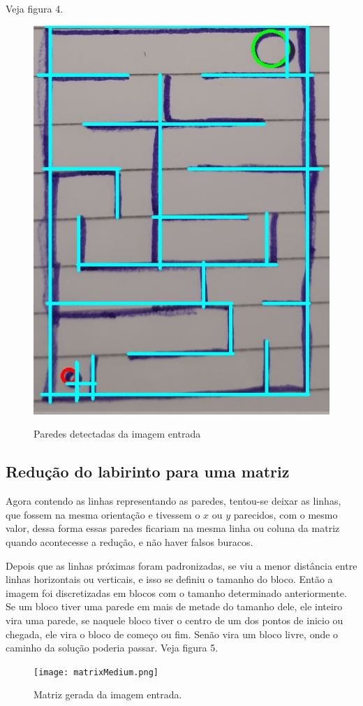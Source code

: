 \documentclass[conference]{IEEEtran}
\begin{document}
Veja figura 4.
 \begin{figure}[h!]
   \centering
    \includegraphics[scale=0.25]{lineImagemedium.jpg}
    \label{fig:medium}
    \caption{Paredes detectadas da imagem entrada}
\end{figure}
\subsection{Redução do labirinto para uma matriz}
Agora contendo as linhas representando as paredes, tentou-se deixar as linhas, que fossem na mesma orientação e tivessem o \(x\) ou \(y\) parecidos, com o mesmo valor, dessa forma essas paredes ficariam na mesma linha ou coluna da matriz quando acontecesse a redução, e não haver falsos buracos.

Depois que as linhas próximas foram padronizadas, se viu a menor distância entre linhas horizontais ou verticais, e isso se definiu o tamanho do bloco. Então a imagem foi discretizadas em blocos com o tamanho determinado anteriormente. Se um bloco tiver uma parede em mais de metade do tamanho dele, ele inteiro vira uma parede, se naquele bloco tiver o centro de um dos pontos de inicio ou chegada, ele vira o bloco de começo ou fim. Senão vira um bloco livre, onde o caminho da solução poderia passar.  Veja figura 5.
 \begin{figure}[h!]
   \centering
    \texttt{[image: matrixMedium.png]}
    \label{fig:medium}
    \caption{Matriz gerada da imagem entrada.}
\end{figure}
\end{document}
